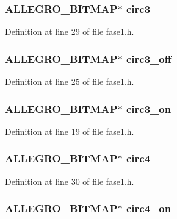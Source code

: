 \hypertarget{struct_level_one_aaa21201ceebf455212233414bd6eedbc}{
\subsubsection[{circ3}]{\setlength{\rightskip}{0pt plus 5cm}A\-L\-L\-E\-G\-R\-O\-\_\-\-B\-I\-T\-M\-A\-P$\ast$ circ3}}\label{struct_level_one_aaa21201ceebf455212233414bd6eedbc}


Definition at line 29 of file fase1.\-h.

\hypertarget{struct_level_one_a91273d7098df87dd93c9f9a10b62ed08}{
\subsubsection[{circ3\-\_\-off}]{\setlength{\rightskip}{0pt plus 5cm}A\-L\-L\-E\-G\-R\-O\-\_\-\-B\-I\-T\-M\-A\-P$\ast$ circ3\-\_\-off}}\label{struct_level_one_a91273d7098df87dd93c9f9a10b62ed08}


Definition at line 25 of file fase1.\-h.

\hypertarget{struct_level_one_ad58139cfabe6836662aec8a3293c9208}{
\subsubsection[{circ3\-\_\-on}]{\setlength{\rightskip}{0pt plus 5cm}A\-L\-L\-E\-G\-R\-O\-\_\-\-B\-I\-T\-M\-A\-P$\ast$ circ3\-\_\-on}}\label{struct_level_one_ad58139cfabe6836662aec8a3293c9208}


Definition at line 19 of file fase1.\-h.

\hypertarget{struct_level_one_a1adf43c25b4c9b87aeb45c1e4bd24d4f}{
\subsubsection[{circ4}]{\setlength{\rightskip}{0pt plus 5cm}A\-L\-L\-E\-G\-R\-O\-\_\-\-B\-I\-T\-M\-A\-P$\ast$ circ4}}\label{struct_level_one_a1adf43c25b4c9b87aeb45c1e4bd24d4f}


Definition at line 30 of file fase1.\-h.

\hypertarget{struct_level_one_ae514d3cf3c3cb83de5ab4682ead1c7f6}{
\subsubsection[{circ4\-\_\-on}]{\setlength{\rightskip}{0pt plus 5cm}A\-L\-L\-E\-G\-R\-O\-\_\-\-B\-I\-T\-M\-A\-P$\ast$ circ4\-\_\-on}}\label{struct_level_one_ae514d3cf3c3cb83de5ab4682ead1c7f6}


